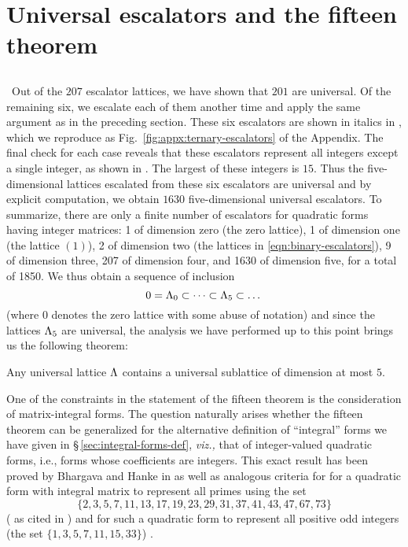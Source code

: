 \section{Universal escalators and the fifteen theorem}

\subsection{}~Out of the \(207\) escalator lattices, we have shown that \(201\)
are universal. Of the remaining six, we escalate each of them another time and
apply the same argument as in the preceding section. These six escalators are
shown  in italics in \cite[Table~3]{bhargava2000conway}, which we reproduce as
Fig.~\ref{fig:appx:ternary-escalators} of the Appendix. The final check for each
case reveals that these escalators represent all integers except a single
integer, as shown in \cite[Table~4]{bhargava2000conway}. The largest of these
integers is \(15\). Thus the five-dimensional lattices escalated from these six
escalators are universal and by explicit computation, we obtain \(1630\)
five-dimensional universal escalators. \cite{moon2008universal} To summarize,
there are only a finite number of escalators for quadratic forms having integer
matrices: 1 of dimension zero (the zero lattice), 1 of dimension one (the
lattice \((1)\)), 2 of dimension two (the lattices in
\eqref{eqn:binary-escalators}), 9 of dimension three, 207 of dimension four, and
1630 of dimension five, for a total of 1850. We thus obtain a sequence of
inclusion
\[
    0 = \Lambda_0 \subset \dots \subset \Lambda_5 \subset \dots
\]
(where \(0\) denotes the zero lattice with some abuse of notation) and since the
lattices \(\Lambda_5\) are universal, the analysis we have performed up to this
point brings us the following theorem:

\begin{theorem}
    Any universal lattice \(\Lambda\) contains a universal sublattice of
    dimension at most \(5\).
\end{theorem}

One of the constraints in the statement of the fifteen theorem is the
consideration of matrix-integral forms. The question naturally arises whether
the fifteen theorem can be generalized for the alternative definition of
``integral'' forms we have given in \S\,\ref{sec:integral-forms-def},
\emph{viz.,} that of integer-valued quadratic forms, i.e., forms whose
coefficients are integers. This exact result has been proved by Bhargava and
Hanke in \cite{bhargava2005universal} as well as analogous criteria for
for a quadratic form with integral matrix to represent all primes using the set
\[\{2, 3, 5, 7, 11, 13, 17, 19, 23, 29, 31, 37, 41, 43, 47, 67, 73\} \]
(\cite{bhargava2005universal} as cited in \cite{kim2004recent}) and for such a
quadratic form to represent all positive odd integers (the set \(\{1, 3, 5, 7,
11, 15, 33\}\)) \cite{hahn2008quadratic}.

